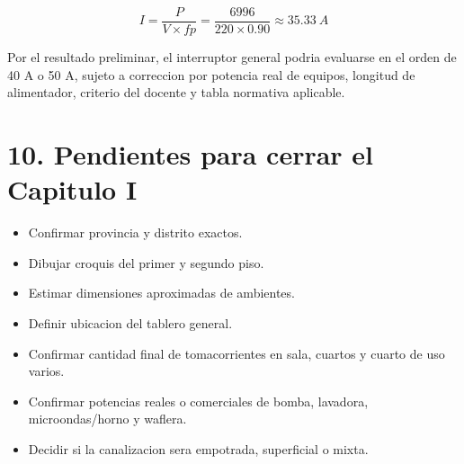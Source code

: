 \documentclass[12pt,a4paper]{article}
\begin{document}
\[
I = \frac{P}{V \times fp} = \frac{6996}{220 \times 0.90} \approx 35.33\ A
\]

Por el resultado preliminar, el interruptor general podria evaluarse en el orden de 40 A o 50 A, sujeto a correccion por potencia real de equipos, longitud de alimentador, criterio del docente y tabla normativa aplicable.

\section*{10. Pendientes para cerrar el Capitulo I}

\begin{itemize}
  \item Confirmar provincia y distrito exactos.
  \item Dibujar croquis del primer y segundo piso.
  \item Estimar dimensiones aproximadas de ambientes.
  \item Definir ubicacion del tablero general.
  \item Confirmar cantidad final de tomacorrientes en sala, cuartos y cuarto de uso varios.
  \item Confirmar potencias reales o comerciales de bomba, lavadora, microondas/horno y waflera.
  \item Decidir si la canalizacion sera empotrada, superficial o mixta.
\end{itemize}
\end{document}
